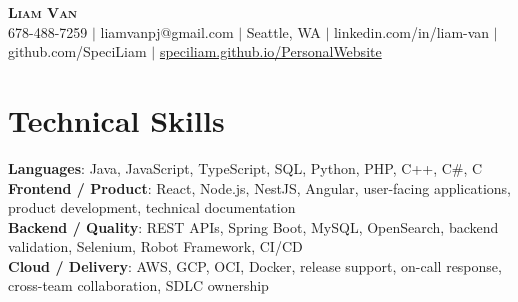 \documentclass[letterpaper,11pt]{article}
\begin{document}

%
\begin{center}
    \textbf{\Huge \scshape Liam Van} \\ \vspace{1pt}
    \small 678-488-7259 $|$ \small {liamvanpj@gmail.com} $|$ Seattle, WA
 {{$|$ linkedin.com/in/liam-van} {$|$ github.com/SpeciLiam} {$|$ \href{https://speciliam.github.io/PersonalWebsite}{speciliam.github.io/PersonalWebsite}}}

\end{center}

\section{Technical Skills}
 \begin{itemize}[leftmargin=0.15in, label={}]
    \small{\item{
     \textbf{Languages}{: Java, JavaScript, TypeScript, SQL, Python, PHP, C++, C\#, C} \\
     \textbf{Frontend / Product}{: React, Node.js, NestJS, Angular, user-facing applications, product development, technical documentation} \\
     \textbf{Backend / Quality}{: REST APIs, Spring Boot, MySQL, OpenSearch, backend validation, Selenium, Robot Framework, CI/CD} \\
     \textbf{Cloud / Delivery}{: AWS, GCP, OCI, Docker, release support, on-call response, cross-team collaboration, SDLC ownership} \\
    }}
 \end{itemize}
%
\end{document}
